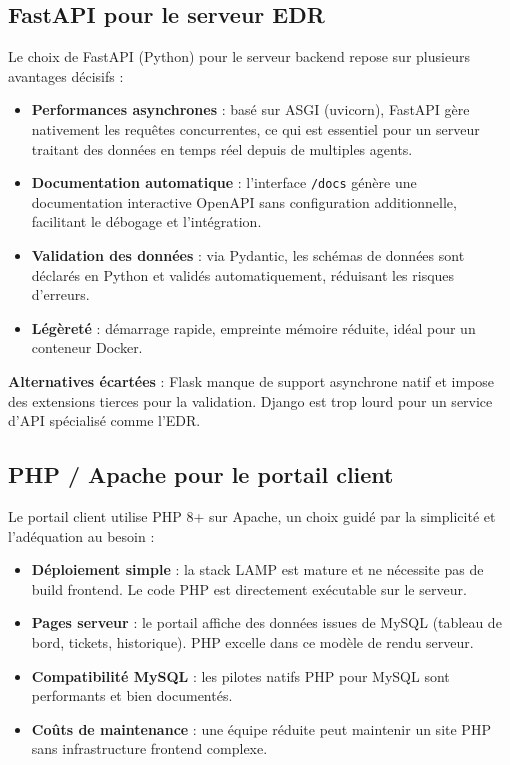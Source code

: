 \subsection{FastAPI pour le serveur EDR}

Le choix de FastAPI (Python) pour le serveur backend repose sur plusieurs
avantages décisifs :

\begin{itemize}
  \item \textbf{Performances asynchrones} : basé sur ASGI (uvicorn),
    FastAPI gère nativement les requêtes concurrentes, ce qui est
    essentiel pour un serveur traitant des données en temps réel depuis de
    multiples agents.
  \item \textbf{Documentation automatique} : l'interface \texttt{/docs}
    génère une documentation interactive OpenAPI sans configuration
    additionnelle, facilitant le débogage et l'intégration.
  \item \textbf{Validation des données} : via Pydantic, les schémas de
    données sont déclarés en Python et validés automatiquement, réduisant
    les risques d'erreurs.
  \item \textbf{Légèreté} : démarrage rapide, empreinte mémoire réduite,
    idéal pour un conteneur Docker.
\end{itemize}

\textbf{Alternatives écartées} : Flask manque de support asynchrone natif
et impose des extensions tierces pour la validation. Django est trop lourd
pour un service d'API spécialisé comme l'EDR.

\subsection{PHP / Apache pour le portail client}

Le portail client utilise PHP 8+ sur Apache, un choix guidé par la
simplicité et l'adéquation au besoin :

\begin{itemize}
  \item \textbf{Déploiement simple} : la stack LAMP est mature et ne
    nécessite pas de build frontend. Le code PHP est directement exécutable
    sur le serveur.
  \item \textbf{Pages serveur} : le portail affiche des données issues de
    MySQL (tableau de bord, tickets, historique). PHP excelle dans ce modèle
    de rendu serveur.
  \item \textbf{Compatibilité MySQL} : les pilotes natifs PHP pour MySQL
    sont performants et bien documentés.
  \item \textbf{Coûts de maintenance} : une équipe réduite peut maintenir
    un site PHP sans infrastructure frontend complexe.
\end{itemize}


